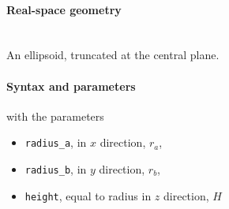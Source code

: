 \paragraph{Real-space geometry}\strut\\
An ellipsoid, truncated at the central plane.

\begin{figure}[h]
\hfill
{}
\hfill
{}
\hfill
{}
\hfill
\end{figure}

\paragraph{Syntax and parameters}
\begin{quote}
\end{quote}
with the parameters
\begin{itemize}
\item \texttt{radius\_a}, in $x$ direction, $r_a$,
\item \texttt{radius\_b}, in $y$ direction, $r_b$,
\item \texttt{height}, equal to radius in $z$ direction, $H$
\end{itemize}


